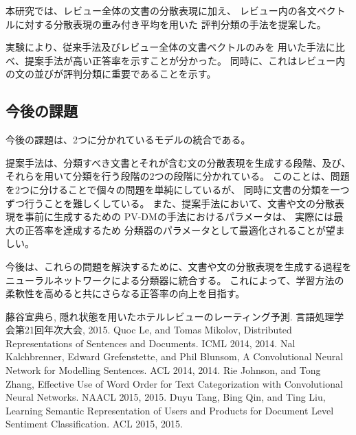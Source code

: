 \documentclass[twocolumn,a4paper]{ltjarticle}
\begin{document}
本研究では、レビュー全体の文書の分散表現に加え、
レビュー内の各文ベクトルに対する分散表現の重み付き平均を用いた
評判分類の手法を提案した。

実験により、従来手法\cite{fujitani15}及びレビュー全体の文書ベクトルのみを
用いた手法に比べ、提案手法が高い正答率を示すことが分かった。
同時に、これはレビュー内の文の並びが評判分類に重要であることを示す。



\subsection{今後の課題}

今後の課題は、2つに分かれているモデルの統合である。

提案手法は、分類すべき文書とそれが含む文の分散表現を生成する段階、及び、
それらを用いて分類を行う段階の2つの段階に分かれている。
このことは、問題を2つに分けることで個々の問題を単純にしているが、
同時に文書の分類を一つずつ行うことを難しくしている。
また、提案手法において、文書や文の分散表現を事前に生成するための
PV-DMの手法におけるパラメータは、 実際には最大の正答率を達成するため
分類器のパラメータとして最適化されることが望ましい。

今後は、これらの問題を解決するために、文書や文の分散表現を生成する過程を
ニューラルネットワークによる分類器に統合する。
これによって、学習方法の柔軟性を高めると共にさらなる正答率の向上を目指す。





\begin{thebibliography}{9}
  藤谷宣典ら,
  隠れ状態を用いたホテルレビューのレーティング予測.
  言語処理学会第21回年次大会, 2015.
  Quoc Le, and Tomas Mikolov,
  Distributed Representations of Sentences and Documents.
  ICML 2014, 2014.
  Nal Kalchbrenner, Edward Grefenstette, and Phil Blunsom,
  A Convolutional Neural Network for Modelling Sentences.
  ACL 2014, 2014.
  Rie Johnson, and Tong Zhang,
  Effective Use of Word Order for Text Categorization
  with Convolutional Neural Networks.
  NAACL 2015, 2015.
  Duyu Tang, Bing Qin, and Ting Liu,
  Learning Semantic Representation of Users and Products
  for Document Level Sentiment Classification.
  ACL 2015, 2015.
\end{thebibliography}
\end{document}
